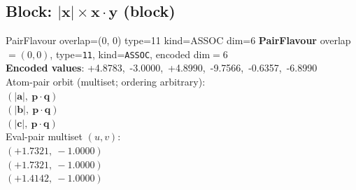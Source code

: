 \documentclass[a4paper,11pt]{article}
\newcommand{\vc}[1]{\ensuremath{\mathbf{#1}}}
\newcommand{\dnfagmiihhiejm}[1]{|\vc{#1}|}
\newcommand{\pdcegfomjfhook}[2]{\mathbf{#1} \cdot \mathbf{#2}}
\begin{document}
\subsection{Block: $\dnfagmiihhiejm{x} \times \pdcegfomjfhook{x}{y}$  (block)}
    PairFlavour  overlap=(0, 0)  type=11  kind=ASSOC  dim=6
\textbf{PairFlavour} overlap$=(0, 0)$, type=\texttt{11}, kind=\texttt{ASSOC}, encoded dim$=6$\\
\textbf{      Encoded values}: +4.8783,\ -3.0000,\ +4.8990,\ -9.7566,\ -0.6357,\ -6.8990\\
\quad Atom-pair orbit (multiset; ordering arbitrary):\\
$(\dnfagmiihhiejm{a},\ \pdcegfomjfhook{p}{q})$\\
$(\dnfagmiihhiejm{b},\ \pdcegfomjfhook{p}{q})$\\
$(\dnfagmiihhiejm{c},\ \pdcegfomjfhook{p}{q})$\\
\quad Eval-pair multiset $(u, v)$:\\
$(+1.7321,\ -1.0000)$\\
$(+1.7321,\ -1.0000)$\\
$(+1.4142,\ -1.0000)$\\
\end{document}
